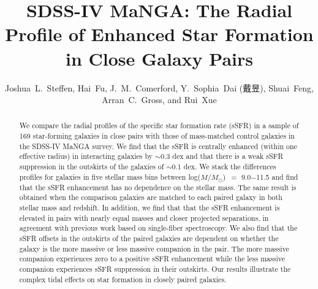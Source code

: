 \documentclass[apj,twocolumn]{emulateapj}
\newcommand{\logm}{log($M/M_{\odot}$)}
\begin{document}
\begin{CJK*}{UTF8}{gbsn}
\title{SDSS-IV MaNGA: The Radial Profile of Enhanced Star Formation in Close Galaxy Pairs}

\author{
Joshua~L.~Steffen, Hai~Fu, J.~M.~Comerford, Y.~Sophia~Dai (戴昱), Shuai~Feng, Arran~C.~Gross, and Rui~Xue
}



\begin{abstract}
We compare the radial profiles of the specific star formation rate (sSFR) in a sample of 169 star-forming galaxies in close pairs with those of mass-matched control galaxies in the SDSS-IV MaNGA survey. We find that the sSFR is centrally enhanced (within one effective radius) in interacting galaxies by $\sim$0.3 dex and that there is a weak sSFR suppression in the outskirts of the galaxies of $\sim$0.1 dex. We stack the differences profiles for galaxies in five stellar mass bins between \logm\ $=$ 9.0$-$11.5 and find that the sSFR enhancement has no dependence on the stellar mass. The same result is obtained when the comparison galaxies are matched to each paired galaxy in both stellar mass and redshift. In addition, we find that that the sSFR enhancement is elevated in pairs with nearly equal masses and closer projected separations, in agreement with previous work based on single-fiber spectroscopy. We also find that the sSFR offsets in the outskirts of the paired galaxies are dependent on whether the galaxy is the more massive or less massive companion in the pair. The more massive companion experiences zero to a positive sSFR enhancement while the less massive companion experiences sSFR suppression in their outskirts. Our results illustrate the complex tidal effects on star formation in closely paired galaxies.
\end{abstract}


\end{CJK*}
\end{document}
